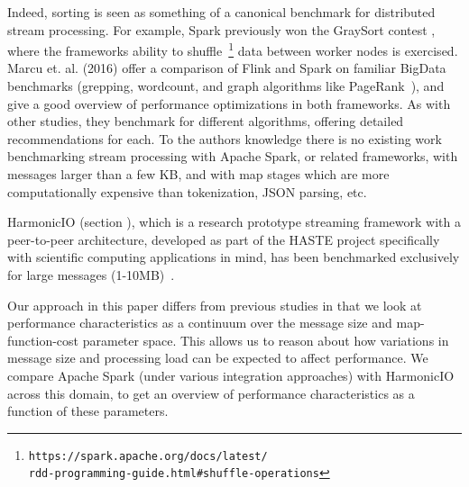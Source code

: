 \documentclass[conference]{IEEEtran}
\begin{document}
Indeed, sorting is seen as something of a canonical benchmark for distributed stream processing. For example, Spark previously won the GraySort contest \cite{xinApacheSparkFastest2014}, where the frameworks ability to shuffle~\footnote{\texttt{https://spark.apache.org/docs/latest/\\rdd-programming-guide.html\#shuffle-operations}} data between worker nodes is exercised.
Marcu et. al. (2016)\nocite{marcuSparkFlinkUnderstanding2016} offer a comparison of Flink and Spark on familiar BigData benchmarks (grepping, wordcount, and graph algorithms like PageRank~\cite{pagePageRankCitationRanking1999}), and give a good overview of performance optimizations in both frameworks. As with other studies, they benchmark for different algorithms, offering detailed recommendations for each. 
To the authors knowledge there is no existing work benchmarking stream processing with Apache Spark, or related frameworks, with messages larger than a few KB, and with map stages which are more computationally expensive than tokenization, JSON parsing, etc.

HarmonicIO (section \cite{ref:hio}), which is a research prototype streaming framework with a peer-to-peer architecture, developed as part of the HASTE project specifically with scientific computing applications in mind, has been benchmarked exclusively for large messages (1-10MB)~\cite{torruangwatthanaHarmonicIOScalableData2018}.

Our approach in this paper differs from previous studies in that we look at performance characteristics as a continuum over the message size and map-function-cost parameter space. This allows us to reason about how variations in message size and processing load can be expected to affect performance. We compare Apache Spark (under various integration approaches) with HarmonicIO across this domain, to get an overview of performance characteristics as a function of these parameters.

\end{document}
